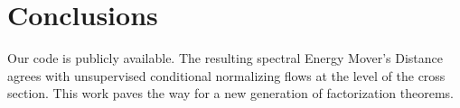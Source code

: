 \section{Conclusions}\label{sec:conclusions}

Our code is publicly available. The resulting spectral Energy Mover's
Distance agrees with unsupervised conditional normalizing flows at the
level of the cross section. This work paves the way for a new generation
of factorization theorems.

